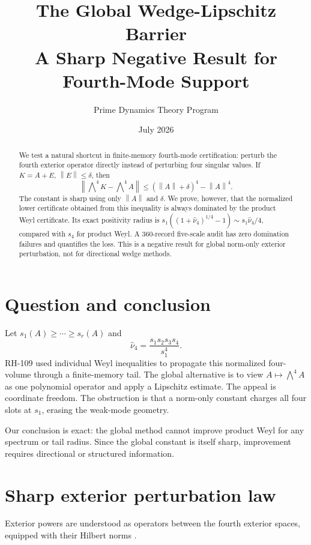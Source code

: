 \documentclass[11pt]{article}
\title{The Global Wedge-Lipschitz Barrier\\\large A Sharp Negative Result for Fourth-Mode Support}
\author{Prime Dynamics Theory Program}
\date{July 2026}
\newcommand{\norm}[1]{\left\lVert#1\right\rVert}
\newcommand{\wed}{\mathop{\bigwedge}\nolimits}
\begin{document}
\maketitle
\begin{abstract}
We test a natural shortcut in finite-memory fourth-mode certification: perturb
the fourth exterior operator directly instead of perturbing four singular
values.  If $K=A+E$, $\norm{E}\leq\delta$, then
\[
 \norm{\wed^4K-\wed^4A}\leq(\norm A+\delta)^4-\norm A^4.
\]
The constant is sharp using only $\norm A$ and $\delta$.  We prove, however,
that the normalized lower certificate obtained from this inequality is
always dominated by the product Weyl certificate.  Its exact positivity
radius is $s_1((1+\widehat\nu_4)^{1/4}-1)\sim
s_1\widehat\nu_4/4$, compared with $s_4$ for product Weyl.  A 360-record
five-scale audit has zero domination failures and quantifies the loss.  This
is a negative result for global norm-only exterior perturbation, not for
directional wedge methods.
\end{abstract}

\section{Question and conclusion}
Let $s_1(A)\geq\cdots\geq s_r(A)$ and
\[
 \widehat\nu_4=\frac{s_1s_2s_3s_4}{s_1^4}.
\]
RH-109 used individual Weyl inequalities to propagate this normalized
four-volume through a finite-memory tail.  The global alternative is to view
$A\mapsto\wed^4A$ as one polynomial operator and apply a Lipschitz estimate.
The appeal is coordinate freedom.  The obstruction is that a norm-only
constant charges all four slots at $s_1$, erasing the weak-mode geometry.

Our conclusion is exact: the global method cannot improve product Weyl for
any spectrum or tail radius.  Since the global constant is itself sharp,
improvement requires directional or structured information.

\section{Sharp exterior perturbation law}
Exterior powers are understood as operators between the fourth exterior
spaces, equipped with their Hilbert norms \citep{HornJohnson1991}.
\end{document}
